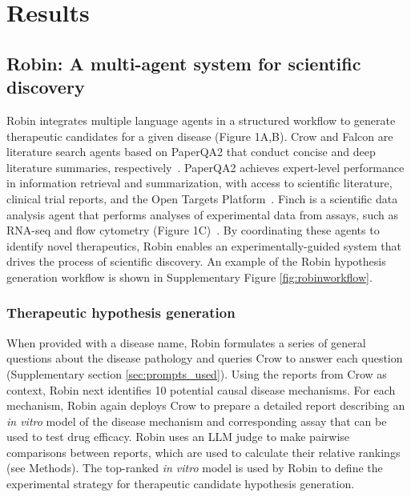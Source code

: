 \documentclass{article}
\begin{document}
\section{Results}
\subsection{Robin: A multi-agent system for scientific discovery}

Robin integrates multiple language agents in a structured workflow to generate therapeutic candidates for a given disease (Figure 1A,B). Crow and Falcon are literature search agents based on PaperQA2 that conduct concise and deep literature summaries, respectively~\cite{skarlinski_language_2024}. PaperQA2 achieves expert-level performance in information retrieval and summarization, with access to  scientific literature, clinical trial reports, and the Open Targets Platform~\cite{10.1093/nar/gkae1128}. Finch is a scientific data analysis agent that performs analyses of experimental data from assays, such as RNA-seq and flow cytometry (Figure 1C)~\cite{Mitchener_Laurent_Tenmann_Narayanan_Wellawatte_White_Sani_Rodriques_2025}. By coordinating these agents to identify novel therapeutics, Robin enables an experimentally-guided system that drives the process of scientific discovery. An example of the Robin hypothesis generation workflow is shown in Supplementary Figure \ref{fig:robinworkflow}.

\subsubsection{Therapeutic hypothesis generation}

When provided with a disease name, Robin formulates a series of general questions about the disease pathology and queries Crow to answer each question (Supplementary section \ref{sec:prompts_used}). Using the reports from Crow as context, Robin next identifies 10 potential causal disease mechanisms. For each mechanism, Robin again deploys Crow to prepare a detailed report describing an \emph{in vitro} model of the disease mechanism and corresponding assay that can be used to test drug efficacy. Robin uses an LLM judge to make pairwise comparisons between reports, which are used to calculate their relative rankings (see Methods). The top-ranked \emph{in vitro} model is used by Robin to define the experimental strategy for therapeutic candidate hypothesis generation.
\end{document}
